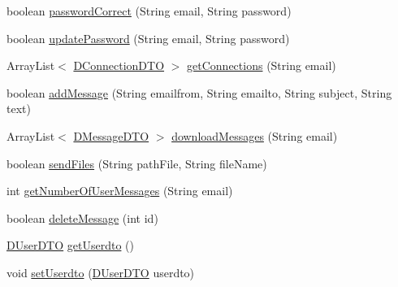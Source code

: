 \begin{DoxyCompactItemize}
boolean \mbox{\hyperlink{classes_1_1deusto_1_1bspq18_1_1e6_1_1_deusto_box_1_1_client_1_1controller_1_1_controller_a4ac688f51915b4557f276c86091bdf18}{password\+Correct}} (String email, String password)
\item 
boolean \mbox{\hyperlink{classes_1_1deusto_1_1bspq18_1_1e6_1_1_deusto_box_1_1_client_1_1controller_1_1_controller_aa89395e5fe1388292fddae864ca16765}{update\+Password}} (String email, String password)
\item 
Array\+List$<$ \mbox{\hyperlink{classes_1_1deusto_1_1bspq18_1_1e6_1_1_deusto_box_1_1_server_1_1dto_1_1_d_connection_d_t_o}{D\+Connection\+D\+TO}} $>$ \mbox{\hyperlink{classes_1_1deusto_1_1bspq18_1_1e6_1_1_deusto_box_1_1_client_1_1controller_1_1_controller_a00b07e74b392861bf33230cd9c2743b3}{get\+Connections}} (String email)
\item 
boolean \mbox{\hyperlink{classes_1_1deusto_1_1bspq18_1_1e6_1_1_deusto_box_1_1_client_1_1controller_1_1_controller_a94aca031c4d92a581036dff8f7784c89}{add\+Message}} (String emailfrom, String emailto, String subject, String text)
\item 
Array\+List$<$ \mbox{\hyperlink{classes_1_1deusto_1_1bspq18_1_1e6_1_1_deusto_box_1_1_server_1_1dto_1_1_d_message_d_t_o}{D\+Message\+D\+TO}} $>$ \mbox{\hyperlink{classes_1_1deusto_1_1bspq18_1_1e6_1_1_deusto_box_1_1_client_1_1controller_1_1_controller_af5d6aa5921e35df50ed907344a4d8ab5}{download\+Messages}} (String email)
\item 
boolean \mbox{\hyperlink{classes_1_1deusto_1_1bspq18_1_1e6_1_1_deusto_box_1_1_client_1_1controller_1_1_controller_a5817d0c4e59edbc9b95fd9089e52849e}{send\+Files}} (String path\+File, String file\+Name)
\item 
int \mbox{\hyperlink{classes_1_1deusto_1_1bspq18_1_1e6_1_1_deusto_box_1_1_client_1_1controller_1_1_controller_a32e13a351d673c45ea91971efe6e3ac5}{get\+Number\+Of\+User\+Messages}} (String email)
\item 
boolean \mbox{\hyperlink{classes_1_1deusto_1_1bspq18_1_1e6_1_1_deusto_box_1_1_client_1_1controller_1_1_controller_a5c07142a949f9ad8e5a489f19cb73c5a}{delete\+Message}} (int id)
\item 
\mbox{\hyperlink{classes_1_1deusto_1_1bspq18_1_1e6_1_1_deusto_box_1_1_server_1_1dto_1_1_d_user_d_t_o}{D\+User\+D\+TO}} \mbox{\hyperlink{classes_1_1deusto_1_1bspq18_1_1e6_1_1_deusto_box_1_1_client_1_1controller_1_1_controller_a2971b74004f56984f425967d5ddfffdc}{get\+Userdto}} ()
\item 
void \mbox{\hyperlink{classes_1_1deusto_1_1bspq18_1_1e6_1_1_deusto_box_1_1_client_1_1controller_1_1_controller_a837623ed4875f6b25560e83d3beae961}{set\+Userdto}} (\mbox{\hyperlink{classes_1_1deusto_1_1bspq18_1_1e6_1_1_deusto_box_1_1_server_1_1dto_1_1_d_user_d_t_o}{D\+User\+D\+TO}} userdto)

\end{DoxyCompactItemize}
